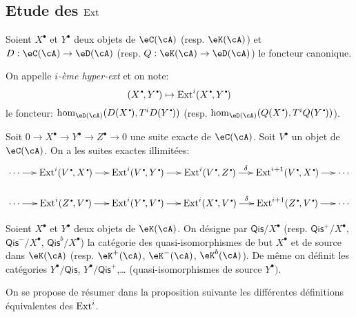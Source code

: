 \subsection{Etude des $\operatorname{Ext}$}\label{VIII:3-2}

Soient $X^\bullet$ et $Y^\bullet$ deux objets de $\eC(\cA)$ (resp. $\eK(\cA)$) 
et $D:\eC(\cA) \to \eD(\cA)$ (resp. $Q:\eK(\cA) \to \eD(\cA)$) le foncteur 
canonique. 





\begin{definition}\label{VIII:3-2-1}
On appelle \emph{$i$-\`eme hyper-ext} et on note: 
\[
  (X^\bullet,Y^\bullet)\mapsto \ext^i(X^\bullet,Y^\bullet) 
\]
le foncteur: $\hom_{\eD(\cA)}(D(X^\bullet),T^i D(Y^\bullet))$ (resp. 
$\hom_{\eD(\cA)}(Q(X^\bullet),T^i Q(Y^\bullet))$). 
\end{definition}





\begin{proposition}\label{VIII:3-2-2}
Soit $0 \to X^\bullet \to Y^\bullet \to Z^\bullet \to 0$ une suite exacte de 
$\eC(\cA)$. Soit $V^\bullet$ un objet de $\eC(\cA)$. On a les suites exactes 
illimit\'ees: 
\[\xymatrix@=0.5cm{
  \cdots \ar[r] 
    & \ext^i(V^\bullet,X^\bullet) \ar[r] 
    & \ext^i(V^\bullet,Y^\bullet) \ar[r] 
    & \ext^i(V^\bullet,Z^\bullet) \ar[r]^-\delta 
    & \ext^{i+1}(V^\bullet,X^\bullet) \ar[r] 
    & \cdots \\
  \cdots \ar[r] 
    & \ext^i(Z^\bullet,V^\bullet) \ar[r] 
    & \ext^i(Y^\bullet,V^\bullet) \ar[r] 
    & \ext^i(X^\bullet,V^\bullet) \ar[r]^-\delta 
    & \ext^{i+1}(Z^\bullet,V^\bullet) \ar[r] 
    & \cdots
}\]
\end{proposition}

Soient $X^\bullet$ et $Y^\bullet$ deux objets de $\eK(\cA)$. On d\'esigne par 
$\mathsf{Qis}/X^\bullet$ (resp. $\mathsf{Qis}^+/X^\bullet$, 
$\mathsf{Qis}^-/X^\bullet$, $\mathsf{Qis}^b/X^\bullet$) la cat\'egorie des 
quasi-isomorphismes de but $X^\bullet$ et de source dans $\eK(\cA)$ (resp. 
$\eK^+(\cA)$, $\eK^-(\cA)$, $\eK^b(\cA)$). De m\^eme on d\'efinit les 
cat\'egories $Y^\bullet/\mathsf{Qis}$, $Y^\bullet/\mathsf{Qis}^+$,\ldots 
(quasi-isomorphismes de source $Y^\bullet)$. 

On se propose de r\'esumer dans la proposition suivante les diff\'erentes 
d\'efinitions \'equivalentes des $\operatorname{Ext}^i$. 





